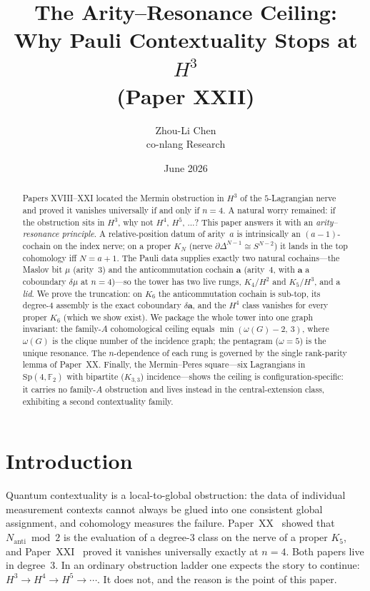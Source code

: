 \documentclass[11pt,a4paper]{article}
\title{\textbf{The Arity--Resonance Ceiling:\\
  Why Pauli Contextuality Stops at $H^3$}\\[4pt]
\large (Paper XXII)}
\author{Zhou-Li Chen\\[2pt]\small co-nlang Research}
\date{June 2026}
\newcommand{\Nanti}{N_{\mathrm{anti}}}
\newcommand{\Sp}{\mathrm{Sp}}
\newcommand{\F}{\mathbb{F}}
\theoremstyle{plain}
\theoremstyle{definition}
\theoremstyle{remark}
\begin{document}
\maketitle

\begin{abstract}
Papers XVIII--XXI located the Mermin obstruction in $H^3$ of the
$5$-Lagrangian nerve and proved it vanishes universally if and only if $n=4$.
A natural worry remained: if the obstruction sits in $H^3$, why not $H^4$, $H^5$,
$\ldots$?  This paper answers it with an \emph{arity--resonance principle}.
A relative-position datum of arity~$a$ is intrinsically an $(a-1)$-cochain on the
index nerve; on a proper $K_N$ (nerve $\partial\Delta^{N-1}\cong S^{N-2}$) it lands
in the top cohomology iff $N=a+1$.  The Pauli data supplies exactly two natural
cochains---the Maslov bit $\mu$ (arity~$3$) and the anticommutation cochain
$\mathbf a$ (arity~$4$, with $\mathbf a$ a coboundary $\delta\mu$ at $n=4$)---so the
tower has two live rungs, $K_4/H^2$ and $K_5/H^3$, and a \emph{lid}.
We prove the truncation: on $K_6$ the anticommutation cochain is sub-top, its
degree-$4$ assembly is the exact coboundary $\delta\mathbf a$, and the
$H^4$ class vanishes for every proper $K_6$ (which we show exist).  We package the
whole tower into one graph invariant: the family-$A$ cohomological ceiling equals
$\min(\omega(G)-2,\,3)$, where $\omega(G)$ is the clique number of the incidence
graph; the pentagram ($\omega=5$) is the unique resonance.  The $n$-dependence of
each rung is governed by the single rank-parity lemma of Paper~XX.
Finally, the Mermin--Peres square---six Lagrangians in $\Sp(4,\F_2)$ with bipartite
($K_{3,3}$) incidence---shows the ceiling is configuration-specific: it carries no
family-$A$ obstruction and lives instead in the central-extension class, exhibiting
a second contextuality family.
\end{abstract}

\section{Introduction}

Quantum contextuality is a local-to-global obstruction: the data of individual
measurement contexts cannot always be glued into one consistent global assignment,
and cohomology measures the failure.  Paper~XX~\cite{PaperXX} showed that
$\Nanti\bmod2$ is the evaluation of a degree-$3$ class on the nerve of a proper
$K_5$, and Paper~XXI~\cite{PaperXXI} proved it vanishes universally exactly at
$n=4$.  Both papers live in degree~$3$.
In an ordinary obstruction ladder one expects the story to continue:
$H^3\to H^4\to H^5\to\cdots$.  It does not, and the reason is the point of this
paper.
\end{document}
